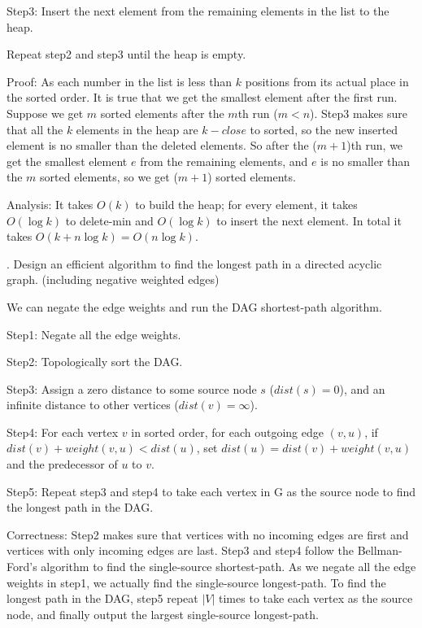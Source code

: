 \documentclass[11pt]{article}
\begin{document}
\noindent
Step3: Insert the next element from the remaining elements in the list to the heap.

\noindent
Repeat step2 and step3 until the heap is empty.

\noindent
Proof: As each number in the list is less than $k$ positions from its actual place in the sorted order. It is true that we get the smallest element after the first run. Suppose we get $m$ sorted elements after the $m$th run ($m<n$). Step3 makes sure that all the $k$ elements in the heap are $k-close$ to sorted, so the new inserted element is no smaller than the deleted elements. So after the ($m+1$)th run, we get the smallest element $e$ from the remaining elements, and $e$ is no smaller than the $m$ sorted elements, so we get ($m+1$) sorted elements. 

\noindent
Analysis: It takes $O(k)$ to build the heap; for every element, it takes $O(\log k)$ to delete-min and $O(\log k)$ to insert the next element. In total it takes $O(k + n \log k) = O(n \log k)$.


. Design an efficient algorithm to find the longest path in a directed acyclic graph. (including negative weighted edges)

\noindent
We can negate the edge weights and run the DAG shortest-path algorithm. 

\noindent
Step1: Negate all the edge weights.

\noindent
Step2: Topologically sort the DAG.

\noindent
Step3: Assign a zero distance to some source node $s$ ($dist(s)=0$), and an infinite distance to other vertices ($dist(v)=\infty$).

\noindent
Step4: For each vertex $v$ in sorted order, for each outgoing edge $(v, u)$, if $dist(v) + weight(v, u) < dist(u)$, set $dist(u)=dist(v) + weight(v, u)$ and the predecessor of $u$ to $v$.

\noindent
Step5: Repeat step3 and step4 to take each vertex in G as the source node to find the longest path in the DAG.

\noindent
Correctness: Step2 makes sure that vertices with no incoming edges are first and vertices with only incoming edges are last. Step3 and step4 follow the Bellman-Ford's algorithm to find the single-source shortest-path. As we negate all the edge weights in step1, we actually find the single-source longest-path. To find the longest path in the DAG, step5 repeat $|V|$ times to take each vertex as the source node, and finally output the largest single-source longest-path.
\end{document}

